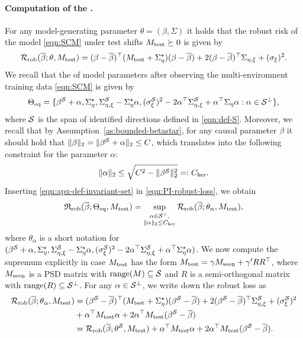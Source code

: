 \paragraph{Computation of the \idRR.} For any model-generating parameter $\theta = (\beta, \Sigma)$ it holds that the robust risk of the model \cref{eqn:SCM} under test shifts $M_{\mathrm{test}} \succeq 0$ is given by 
\begin{align*}
    \mathcal{R}_{\mathrm{rob}}(\overline{\beta};\theta, M_{\mathrm{test}}) =  (\beta - \overline{\beta})^\top(M_{\mathrm{test}} + \Sigma^\star_{\eta})(\beta - \overline{\beta}) + 2(\beta - \overline{\beta})^\top \Sigma_{\eta,\xi} + (\sigma_\xi)^2. 
\end{align*}
We recall that the \idset of model parameters after observing the multi-environment training data \cref{eqn:SCM} is given by 
\begin{align}\label{eqn:apx-def-invariant-set}
     \Theta_{\mathrm{eq}} = \{ \beta^{\mathcal{S}} + \alpha, \Sigma^\star_{\eta}, \Sigma^{\mathcal{S}}_{\eta,\xi} - \Sigma^\star_{\eta} \alpha, ({\sigma_\xi^{\mathcal{S}}})^2 - 2 \alpha^\top \Sigma^{\mathcal{S}}_{\eta,\xi} + \alpha^\top \Sigma_{\eta} \alpha: \alpha \in \mathcal{S}^\perp \},
\end{align}
where $\mathcal{S}$ is the span of identified directions defined in \cref{eqn:def-S}. 
Moreover, we recall that by Assumption~\ref{as:bounded-betastar}, for any causal parameter $\beta$ it should hold that $\| \beta \|_2 = \| \beta^{\mathcal{S}} + \alpha \|_2 \leq C$, which translates into the following constraint for the parameter $\alpha$:
\begin{align*}
    \| \alpha \|_2 \leq \sqrt{C^2 - \| \beta^{\mathcal{S}} \|_2^2} =: C_{\mathrm{ker}}. 
\end{align*}
Inserting \cref{eqn:apx-def-invariant-set} in \cref{eqn:PI-robust-loss}, we obtain
\begin{align*}
    \mathfrak{R}_{\mathrm{rob}}(\overline{\beta}; \Theta_{\mathrm{eq}}, M_{\mathrm{test}}) = \sup_{\substack{\alpha \in \mathcal{S}^\perp, \\ \| \alpha \|_2 \leq C_{\mathrm{ker}}} } \mathcal{R}_{\mathrm{rob}}(\overline{\beta}; \theta_{\alpha}, M_{\mathrm{test}}),
\end{align*}
where $\theta_\alpha$ is a short notation for $(\beta^{\mathcal{S}} + \alpha, \Sigma^\star_{\eta}, \Sigma^{\mathcal{S}}_{\eta,\xi} - \Sigma^\star_{\eta} \alpha, ({\sigma_\xi^{\mathcal{S}}})^2 - 2 \alpha^\top \Sigma^{\mathcal{S}}_{\eta,\xi} + \alpha^\top \Sigma^\star_{\eta} \alpha)$. We now compute the supremum explicitly in case $M_{\mathrm{test}}$ has the form $M_{\mathrm{test}} = \gamma M_{\mathrm{seen}} + \gamma' R R^\top$, where $M_{\mathrm{seen}}$ is a PSD matrix with $\mathrm{range}(M) \subseteq \mathcal{S}$ and $R$ is a semi-orthogonal matrix with $\mathrm{range}(R) \subseteq \mathcal{S}^\perp$. For any $\alpha \in \mathcal{S}^\perp$, we write down the robust loss as
\begin{align*}
    \mathcal{R}_{\mathrm{rob}}(\overline{\beta}; \theta_\alpha, M_{\mathrm{test}}) &= (\beta^{\mathcal{S}} - \overline{\beta})^\top (M_{\mathrm{test}} + \Sigma^\star_{\eta}) (\beta^{\mathcal{S}} - \overline{\beta}) + 2 (\beta^{\mathcal{S}} - \overline{\beta})^\top \Sigma^{\mathcal{S}}_{\eta,\xi} + ({\sigma_\xi^{\mathcal{S}}})^2 \\
    &+ \alpha^\top M_{\mathrm{test}} \alpha + 2 \alpha^\top M_{\mathrm{test}}(\beta^{\mathcal{S}} -  \overline{\beta} ) \\
    &= \mathcal{R}_{\mathrm{rob}}(\overline{\beta}; \theta^{\mathcal{S}}, M_{\mathrm{test}}) + \alpha^\top M_{\mathrm{test}} \alpha + 2 \alpha^\top M_{\mathrm{test}}(\beta^{\mathcal{S}} -  \overline{\beta} ). 
\end{align*}
